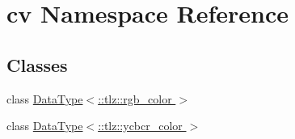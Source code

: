 \hypertarget{namespacecv}{}\section{cv Namespace Reference}
\label{namespacecv}
\subsection*{Classes}
\begin{DoxyCompactItemize}
\item 
class \hyperlink{classcv_1_1DataType_3_1_1tlz_1_1rgb__color_01_4}{Data\+Type$<$\+::tlz\+::rgb\+\_\+color $>$}
\item 
class \hyperlink{classcv_1_1DataType_3_1_1tlz_1_1ycbcr__color_01_4}{Data\+Type$<$\+::tlz\+::ycbcr\+\_\+color $>$}
\end{DoxyCompactItemize}
